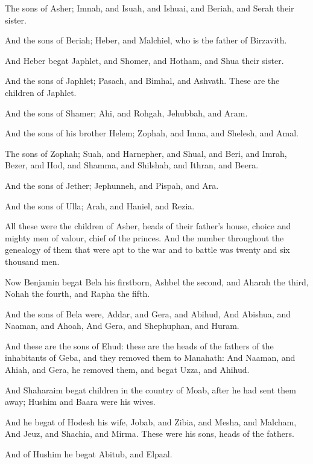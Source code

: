 \Verse The sons of Asher; Imnah, and Isuah, and Ishuai, and Beriah, and Serah their sister.

\Verse And the sons of Beriah; Heber, and Malchiel, who is the father of Birzavith.

\Verse And Heber begat Japhlet, and Shomer, and Hotham, and Shua their sister.

\Verse And the sons of Japhlet; Pasach, and Bimhal, and Ashvath. These are the children of Japhlet.

\Verse And the sons of Shamer; Ahi, and Rohgah, Jehubbah, and Aram.

\Verse And the sons of his brother Helem; Zophah, and Imna, and Shelesh, and Amal.

\Verse The sons of Zophah; Suah, and Harnepher, and Shual, and Beri, and Imrah, \Verse Bezer, and Hod, and Shamma, and Shilshah, and Ithran, and Beera.

\Verse And the sons of Jether; Jephunneh, and Pispah, and Ara.

\Verse And the sons of Ulla; Arah, and Haniel, and Rezia.

\Verse All these were the children of Asher, heads of their father's house, choice and mighty men of valour, chief of the princes. And the number throughout the genealogy of them that were apt to the war and to battle was twenty and six thousand men.


\Chapter
\Verse Now Benjamin begat Bela his firstborn, Ashbel the second, and Aharah the third, \Verse Nohah the fourth, and Rapha the fifth.

\Verse And the sons of Bela were, Addar, and Gera, and Abihud, \Verse And Abishua, and Naaman, and Ahoah, \Verse And Gera, and Shephuphan, and Huram.

\Verse And these are the sons of Ehud: these are the heads of the fathers of the inhabitants of Geba, and they removed them to Manahath: \Verse And Naaman, and Ahiah, and Gera, he removed them, and begat Uzza, and Ahihud.

\Verse And Shaharaim begat children in the country of Moab, after he had sent them away; Hushim and Baara were his wives.

\Verse And he begat of Hodesh his wife, Jobab, and Zibia, and Mesha, and Malcham, \Verse And Jeuz, and Shachia, and Mirma. These were his sons, heads of the fathers.

\Verse And of Hushim he begat Abitub, and Elpaal.

